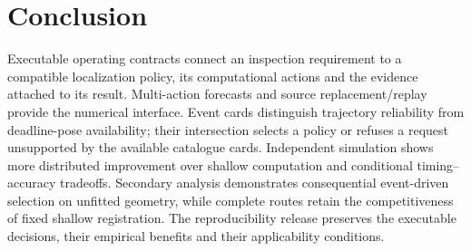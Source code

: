 
\section{Conclusion}
Executable operating contracts connect an inspection requirement to a compatible localization policy, its computational actions and the evidence attached to its result. Multi-action forecasts and source replacement/replay provide the numerical interface. Event cards distinguish trajectory reliability from deadline-pose availability; their intersection selects a policy or refuses a request unsupported by the available catalogue cards. Independent simulation shows more distributed improvement over shallow computation and conditional timing--accuracy tradeoffs. Secondary analysis demonstrates consequential event-driven selection on unfitted geometry, while complete routes retain the competitiveness of fixed shallow registration. The reproducibility release preserves the executable decisions, their empirical benefits and their applicability conditions.
